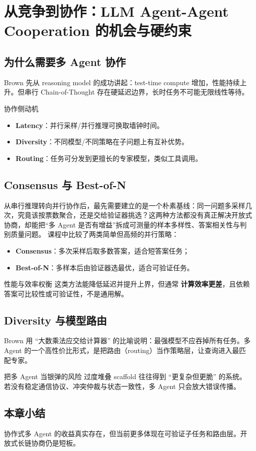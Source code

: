 \section{从竞争到协作：LLM Agent-Agent Cooperation 的机会与硬约束}

\subsection{为什么需要多 Agent 协作}
Brown 先从 reasoning model 的成功讲起：test-time compute 增加，性能持续上升。但串行 Chain-of-Thought 存在硬延迟边界，长时任务不可能无限线性等待。

\begin{knowledgebox}{协作侧动机}
\begin{itemize}
    \item \textbf{Latency}：并行采样/并行推理可换取墙钟时间。
    \item \textbf{Diversity}：不同模型/不同策略在子问题上有互补优势。
    \item \textbf{Routing}：任务可分发到更擅长的专家模型，类似工具调用。
\end{itemize}
\end{knowledgebox}

\subsection{Consensus 与 Best-of-N}
从串行推理转向并行协作后，最先需要建立的是一个朴素基线：同一问题多采样几次，究竟该按票数聚合，还是交给验证器挑选？这两种方法都没有真正解决开放式协商，却能把“多 Agent 是否有增益”拆成可测量的样本多样性、答案相关性与判别质量问题。
课程中比较了两类简单但高频的并行策略：
\begin{itemize}
    \item \textbf{Consensus}：多次采样后取多数答案，适合短答案任务；
    \item \textbf{Best-of-N}：多样本后由验证器选最优，适合可验证任务。
\end{itemize}

\begin{importantbox}{性能与效率权衡}
这类方法能降低延迟并提升上界，但通常 \textbf{计算效率更差}，且依赖答案可比较性或可验证性，不是通用解。
\end{importantbox}

\subsection{Diversity 与模型路由}
Brown 用 ``大数乘法应交给计算器'' 的比喻说明：最强模型不应吞掉所有任务。多 Agent 的一个高性价比形式，是把路由（routing）当作策略层，让查询进入最匹配专家。

\begin{warningbox}{把多 Agent 当银弹的风险}
过度堆叠 scaffold 往往得到 ``更复杂但更脆'' 的系统。若没有稳定通信协议、冲突仲裁与状态一致性，多 Agent 只会放大错误传播。
\end{warningbox}

\subsection{本章小结}
协作式多 Agent 的收益真实存在，但当前更多体现在可验证子任务和路由层。开放式长链协商仍是短板。

